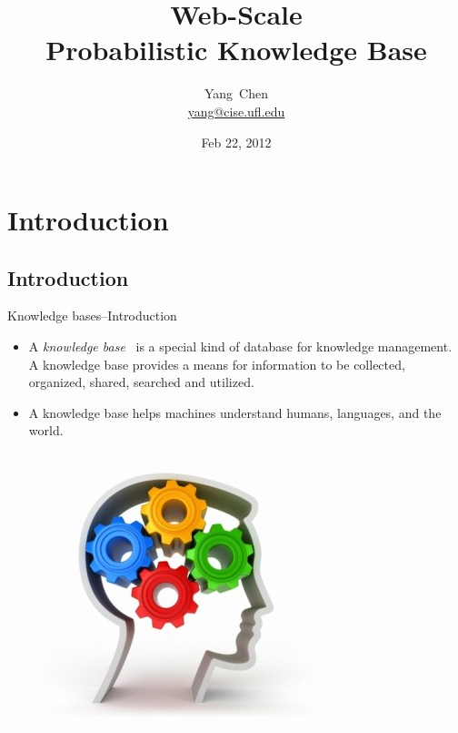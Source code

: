 \documentclass[onlymath,xcolor=pdftex,dvipsnames,table]{beamer}
\title[\probkb Web-Scale Probabilistic Knowledge Base]%
{\probkb Web-Scale\\Probabilistic Knowledge Base}
\author %
{Yang~Chen\\{\footnotesize\url{yang@cise.ufl.edu}}}
\institute[University of Florida] %
{
  Computer and Information Science and Engineering\\
  University of Florida\\
}
\date{Feb 22, 2012} %
\let\oldemph\emph
\renewcommand{\emph}[1]{{\color{Blue}\oldemph{#1}}}
\begin{document}
\maketitle

\section{Introduction}
\subsection{Introduction}
\begin{frame}{Knowledge bases--Introduction}
\begin{itemize}
  \item A \emph{knowledge base}~\cite{nath2010efficient} is a special kind of database for knowledge management.
A knowledge base provides a means for information to be collected, organized,
shared, searched and utilized.
  \item A knowledge base helps machines understand humans, languages, and the world.
\end{itemize}
\begin{figure}
  \centering
  \includegraphics[width=.3\textwidth]{knowledgeBase.jpg}
\end{figure}
\end{frame}
\end{document}
